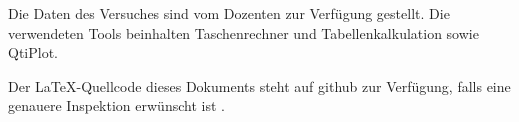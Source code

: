 Die  Daten  des Versuches  sind  vom  Dozenten zur  Verf\"ugung  gestellt. Die
verwendeten  Tools beinhalten  Taschenrechner  und Tabellenkalkulation   sowie
QtiPlot.

Der \LaTeX-Quellcode dieses Dokuments steht  auf github zur Verf\"ugung, falls
eine genauere Inspektion erw\"unscht ist \cite{ref:aw:github}.
